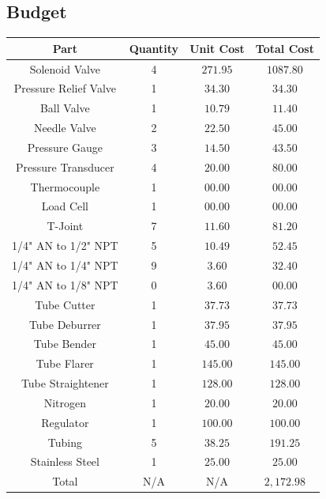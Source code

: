 \documentclass[9pt]{article} %
\numberwithin{equation}{section} %
\begin{document}
\subsection{Budget}
\begin{center}
 \begin{tabular}{|c c c c|} 
 \hline
 Part & Quantity & Unit Cost & Total Cost\\
 \hline\hline
 Solenoid Valve & 4 & $271.95$ & $1087.80$\\ 
 \hline
 Pressure Relief Valve & 1 & $34.30$ & $34.30$\\ 
 \hline
 Ball Valve & 1 & $10.79$ & $11.40$\\ 
 \hline
 Needle Valve & 2 & $22.50$ & $45.00$\\ 
 \hline
 Pressure Gauge & 3 & $14.50$ & $43.50$\\ 
 \hline
 Pressure Transducer & 4 & $20.00$ & $80.00$\\ 
 \hline
 Thermocouple & 1 & $00.00$ & $00.00$\\ 
 \hline
 Load Cell & 1 & $00.00$ & $00.00$\\
 \hline
 T-Joint & 7 & $11.60$ & $81.20$\\
 \hline
 1/4" AN to 1/2" NPT & 5 & $10.49$ & $52.45$\\
 \hline
 1/4" AN to 1/4" NPT & 9 & $3.60$ & $32.40$\\
 \hline
 1/4" AN to 1/8" NPT & 0 & $3.60$ & $00.00$\\
 \hline
 Tube Cutter & 1 & $37.73$ & $37.73$\\
 \hline
 Tube Deburrer & 1 & $37.95$ & $37.95$\\
 \hline
 Tube Bender & 1 & $45.00$ & $45.00$\\
 \hline
 Tube Flarer & 1 & $145.00$ & $145.00$\\
 \hline
 Tube Straightener & 1 & $128.00$ & $128.00$\\
 \hline
 Nitrogen & 1 & $20.00$ & $20.00$\\
 \hline
 Regulator & 1 & $100.00$ & $100.00$\\
 \hline
 Tubing & 5 & $38.25$ & $191.25$\\
 \hline
 Stainless Steel & 1 & $25.00$ & $25.00$\\
 \hline\hline
 Total & N/A & N/A & $2,172.98$\\
 \hline
\end{tabular}
\end{center}
\end{document}
